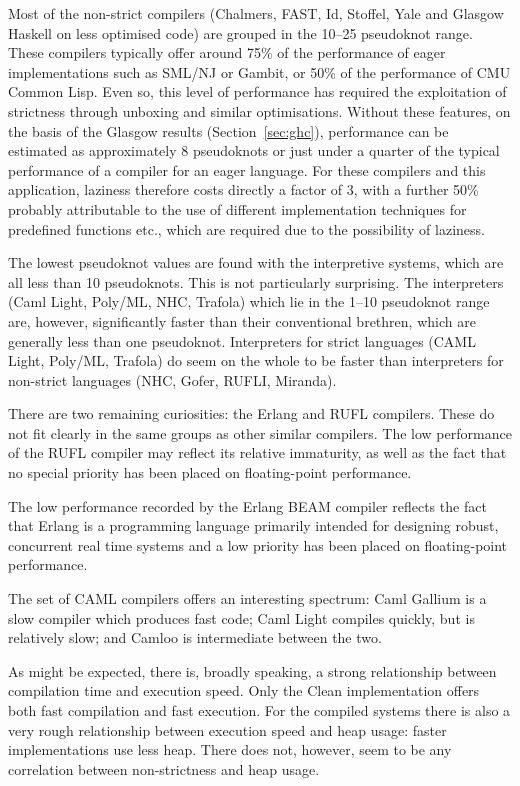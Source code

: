 Most of the non-strict compilers (Chalmers, FAST, Id, Stoffel, Yale
and Glasgow Haskell on less optimised code) are grouped in the 10--25
pseudoknot range.  These compilers typically offer around 75\% of the
performance of eager implementations such as SML/NJ or Gambit, or 50\%
of the performance of CMU Common Lisp.  Even so, this level of performance
has required the exploitation of strictness through unboxing and
similar optimisations.  Without these features, on the basis of the
Glasgow results (Section~\ref{sec:ghc}), performance can be estimated
as approximately 8 pseudoknots or just under a quarter of the typical
performance of a compiler for an eager language.  For these compilers
and this application, laziness therefore costs directly a factor of 3,
with a further 50\% probably attributable to the use of different
implementation techniques for predefined functions etc., which are
required due to the possibility of laziness.

The lowest pseudoknot values are found with the interpretive systems,
which are all less than 10 pseudoknots.  This is not particularly
surprising.  The interpreters (Caml Light, Poly/ML, NHC,
Trafola) which lie in the 1--10 pseudoknot range are, however,
significantly faster than their conventional brethren, which are
generally less than one pseudoknot.  Interpreters for strict languages
(CAML Light, Poly/ML, Trafola) do seem on the whole to be faster
than interpreters for non-strict languages (NHC, Gofer, RUFLI,
Miranda).

There are two remaining curiosities: the Erlang and RUFL compilers.
These do not fit clearly in the same groups as other similar
compilers. The low performance of the RUFL compiler may reflect its
relative immaturity, as well as the fact that no special priority has
been placed on floating-point performance.

The low performance recorded by the Erlang BEAM compiler reflects the
fact that Erlang is a programming language primarily intended for
designing robust, concurrent real time systems and a low priority has
been placed on floating-point performance.

The set of CAML compilers offers an interesting spectrum: Caml Gallium
is a slow compiler which produces fast code; Caml Light compiles
quickly, but is relatively slow; and Camloo is intermediate between
the two.

As might be expected, there is, broadly speaking, a strong
relationship between compilation time and execution speed.  Only the
Clean implementation offers both fast compilation and fast execution.
For the compiled systems there is also a very rough relationship
between execution speed and heap usage: faster implementations
use less heap.  There does not, however, seem to be any
correlation between non-strictness and heap usage.

